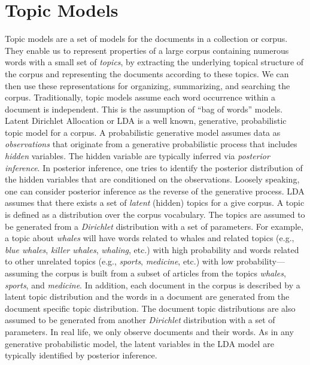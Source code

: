 \section{Topic Models}
\label{sec:topicmodels}


Topic models are a set of models for the documents in a collection 
or corpus. They enable us to represent properties of a large 
corpus containing numerous words with a small set of \textsl{topics}, 
by extracting the underlying topical structure of the corpus and 
representing the documents according to these topics. We can then 
use these representations for organizing, summarizing, and searching 
the corpus. Traditionally, topic models assume each word occurrence 
within a document is independent. This is the assumption of ``bag of 
words'' models. Latent Dirichlet Allocation or LDA 
\cite{Blei2003} is a well known, generative, probabilistic   
topic model for a corpus. A probabilistic generative model assumes 
data as \textsl{observations} that originate from a generative 
probabilistic process that includes \textsl{hidden} variables. The 
hidden variable are typically inferred via \textsl{posterior 
inference}. In posterior inference, one tries to identify the posterior 
distribution of the hidden variables that are conditioned on the observations. 
Loosely speaking, one can consider posterior inference as the 
reverse of the generative process. LDA assumes 
that there exists a set of \textsl{latent} (hidden) topics for a 
give corpus. A topic is defined as a distribution over the corpus 
vocabulary. The topics are assumed to be generated from a 
\textsl{Dirichlet} distribution with a set of parameters. For 
example, a topic about \textit{whales} will have words related to 
whales and related topics (e.g., \textit{blue whales}, \textit{killer whales}, 
\textit{whaling}, etc.) with high probability and words related to 
other unrelated topics (e.g., \textit{sports}, \textit{medicine}, 
etc.) with low probability---assuming the corpus is built from a 
subset of articles from the topics \textit{whales}, \textit{sports}, and 
\textit{medicine}. In addition, each document in the corpus is 
described by a latent topic distribution and the words in a document 
are generated from the document specific topic distribution. The 
document topic distributions 
are also assumed to be generated from another \textsl{Dirichlet} 
distribution with a set of parameters. In real life, we only observe 
documents and their words. As in any generative probabilistic model, 
the latent variables in the LDA model are typically identified by 
posterior inference. 

